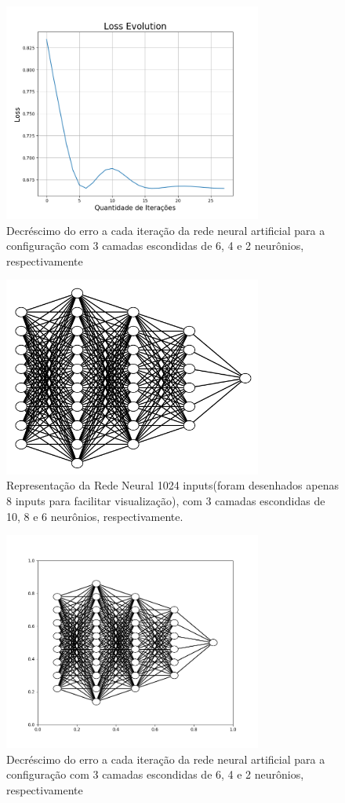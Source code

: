 \documentclass{article}
\begin{document}
\begin{figure}[ht]
\centering
\includegraphics[width=8.5cm]{rna_6_4_2_loss}
\caption{Decréscimo do erro a cada iteração da rede neural artificial para a configuração com 3 camadas escondidas de 6, 4 e 2 neurônios, respectivamente}
\label{rna_6_4_2_loss}
\end{figure}

\begin{figure}[ht]
\centering
\includegraphics[width=8.5cm]{rna_10_8_6}
\caption{Representação da Rede Neural 1024 inputs(foram desenhados apenas 8 inputs para facilitar visualização), com 3 camadas escondidas de 10, 8 e 6 neurônios, respectivamente.}
\label{rna_10_8_6}
\end{figure}

\begin{figure}[ht]
\centering
\includegraphics[width=8.5cm]{rna_10_8_6_loss}
\caption{Decréscimo do erro a cada iteração da rede neural artificial para a configuração com 3 camadas escondidas de 6, 4 e 2 neurônios, respectivamente}
\label{rna_10_8_6_loss}
\end{figure}
\end{document}
